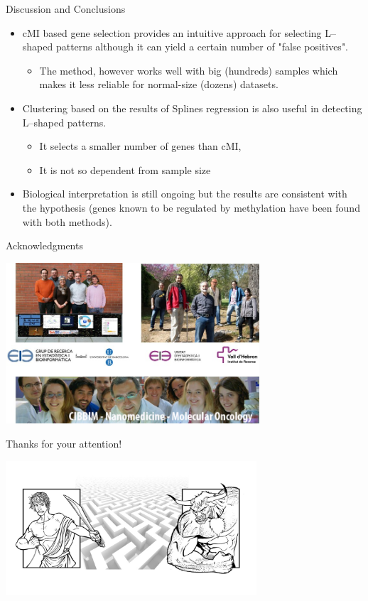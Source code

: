 \documentclass[handout]{beamer}
\begin{document}
\begin{frame}{Discussion and Conclusions}
  \begin{itemize}
  \item cMI based gene selection provides an intuitive approach for selecting L--shaped patterns although it can yield a certain number of "false positives".
  \begin{itemize}
         \item The method, however works well with big (hundreds) samples which makes it less reliable for normal-size (dozens) datasets.
  \end{itemize}
  \item Clustering based on the results of Splines regression is also useful in detecting L--shaped patterns.
       \begin{itemize}
         \item It selects a smaller number of genes than cMI,
         \item It is not so dependent from sample size
       \end{itemize}
  \item Biological interpretation is still ongoing but the results are consistent with the hypothesis
    (genes known to be regulated by methylation have been found with both methods).
\end{itemize}
\end{frame}

\begin{frame}{Acknowledgments}
 \begin{center}
\includegraphics[height=6cm]{./images/agraiments.jpg}
\end{center}
  \end{frame}

\begin{frame}
 \begin{center}
 {\Huge
Thanks for your attention!}
\end{center}

\begin{center}
\includegraphics[height=5cm]{./images/teseo.jpg}
\end{center}


  \end{frame}
\end{document}
